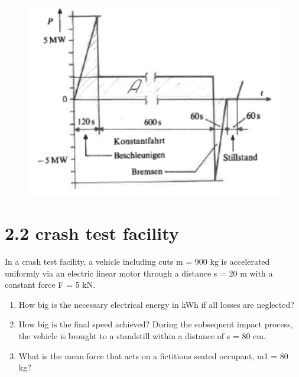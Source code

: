 \documentclass[10pt,ngerman]{scrartcl}
\begin{document}
\begin{figure}[H]
	\centering
	\includegraphics[scale=0.5]{group_work_1.png}
\end{figure}

\section{2.2 crash test facility}
In a crash test facility, a vehicle including cuts m = 900 kg is accelerated uniformly via an electric linear motor through a distance s = 20 m with a constant force F = 5 kN.
\begin{enumerate}
	\item How big is the necessary electrical energy in kWh if all losses are neglected?
	\item How big is the final speed achieved? During the subsequent impact process, the vehicle is brought to a standstill within a distance of s = 80 cm.
	\item What is the mean force that acts on a fictitious seated occupant, m1 = 80 kg?
\end{enumerate}
\end{document}
